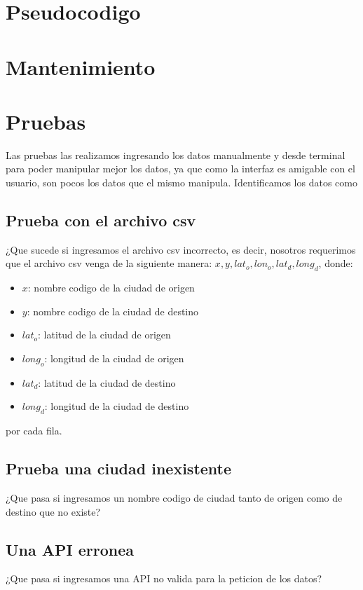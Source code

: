\documentclass[12pt]{article}
\begin{document}
\section{Pseudocodigo}
\begin{algorithmic}[1]
  \EndIf
  \EndIf
  \EndFor
  \EndFor

  \EndIf
  \Else
  \EndIf
  \EndFunction
\end{algorithmic}
\section{Mantenimiento}
\section{Pruebas}
Las pruebas las realizamos ingresando los datos manualmente y desde terminal para poder manipular mejor los datos, ya que como la interfaz es amigable con el usuario, son pocos los datos que el mismo manipula. Identificamos los datos como 
\subsection{Prueba con el archivo csv}
¿Que sucede si ingresamos el archivo csv incorrecto, es decir, nosotros requerimos que el archivo csv venga de la siguiente manera: $x,y,lat_o,lon_o,lat_d, long_d$, donde:
\begin{itemize}
\item $x$: nombre codigo de la ciudad de origen
\item $y$: nombre codigo de la ciudad de destino
\item $lat_o$: latitud de la ciudad de origen
\item $long_o$: longitud de la ciudad de origen
\item $lat_d$: latitud de la ciudad de destino
\item $long_d$: longitud de la ciudad de destino
\end{itemize}
por cada fila.
\subsection{Prueba una ciudad inexistente}
¿Que pasa si ingresamos un nombre codigo de ciudad tanto de origen como de destino que no existe?
\subsection{Una API erronea}
¿Que pasa si ingresamos una API no valida para la peticion de los datos?
\end{document}
